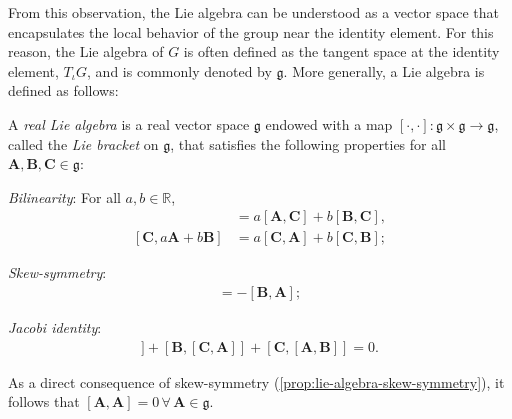 From this observation, the Lie algebra can be understood as a vector space that encapsulates the local behavior of the group near the identity element. For this reason, the Lie algebra of $G$ is often defined as the tangent space at the identity element, $T_\iota G$, and is commonly denoted by $\mathfrak{g}$. More generally, a Lie algebra is defined as follows:
\begin{definition}
    A \emph{real Lie algebra} is a real vector space $\mathfrak{g}$ endowed with a map $[\cdot, \cdot]:\mathfrak{g}\times\mathfrak{g}\to\mathfrak{g}$, called the \emph{Lie bracket} on $\mathfrak{g}$, that satisfies the following properties for all $\mathbf{A},\mathbf{B},\mathbf{C}\in\mathfrak{g}$:
    \begin{property}
        \item \emph{Bilinearity}: For all $a,b\in\mathbb{R}$,
        \begin{align*}
            [a\mathbf{A}+b\mathbf{B}, \mathbf{C}] &= a[\mathbf{A}, \mathbf{C}] + b[\mathbf{B}, \mathbf{C}], \\
             [\mathbf{C}, a\mathbf{A}+b\mathbf{B}] &= a[\mathbf{C}, \mathbf{A}] + b[\mathbf{C}, \mathbf{B}];
        \end{align*}
        \item \emph{Skew-symmetry}: 
        \begin{align*}
            [\mathbf{A}, \mathbf{B}] = -[\mathbf{B}, \mathbf{A}];
        \end{align*} \label{prop:lie-algebra-skew-symmetry}
        \item \emph{Jacobi identity}:
        \begin{align*}
            [\mathbf{A}, [\mathbf{B}, \mathbf{C}]] + [\mathbf{B}, [\mathbf{C}, \mathbf{A}]] + [\mathbf{C}, [\mathbf{A}, \mathbf{B}]] = 0.
        \end{align*}
    \end{property}
\end{definition}
As a direct consequence of skew-symmetry (\cref{prop:lie-algebra-skew-symmetry}), it follows that $[\mathbf{A}, \mathbf{A}]=0\,\forall\,\mathbf{A}\in\mathfrak{g}$. 

